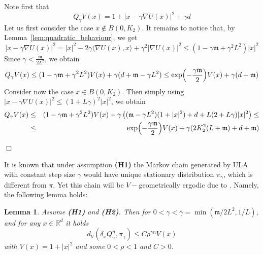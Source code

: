 \documentclass[bj]{imsart}
\def\rset{\mathbb{R}}
\def\rset{\mathbb{R}}
\newcommand{\proofendsign}{$\Box$}
\newtheorem{lem}[thm]{Lemma}
\newenvironment{proof}{{\noindent \bf Proof }}
 {{\hspace*{\fill}\proofendsign\par\bigskip}}
\begin{document}
\begin{proof} 
Note first that
\[
Q_{\gamma}V(x) = 
1+ | x - \gamma \nabla U(x) |^2 + \gamma d
\]
Let us first consider the case $x \notin B(0,K_2)$.  
It remains to notice that, by Lemma~\ref{lem:quadratic_behaviour}, we get
\[
|x - \gamma \nabla U(x) |^2 = |x|^2 - 2\gamma \langle \nabla U(x), x\rangle + \gamma^2 |\nabla U(x)|^2 \leq \left(1 - \gamma \mathfrak{m} + \gamma^2 L^2\right)|x|^2
\]
Since $\gamma < \frac{\mathfrak{m}}{2L^2}$, we obtain
$$
Q_{\gamma}V(x) \leq (1-\gamma \mathfrak{m} + \gamma^2 L^2)V(x) + \gamma (d + \mathfrak{m} - \gamma L^2) \leq \exp\Bigl(-\frac{\gamma \mathfrak{m}}{2}\Bigr)V(x) + \gamma (d + \mathfrak{m})
$$
Consider now the case $x \in B(0,K_2)$. Then simply using $|x-\gamma \nabla U(x)|^2 \leq (1+L\gamma)^2|x|^2$, we obtain
\begin{eqnarray*}
Q_{\gamma}V(x) &\leq & (1-\gamma \mathfrak{m} + \gamma^2 L^2)V(x) + \gamma\left((\mathfrak{m} - \gamma L^2)(1+|x|^2) + d + L(2+L\gamma)|x|^2\right) \leq
\\
&\leq & \exp\Bigl(-\frac{\gamma \mathfrak{m}}{2}\Bigr)V(x) + \gamma(2K_2^2(L+\mathfrak{m}) + d + \mathfrak{m})
\end{eqnarray*}
\end{proof}

It is known that under assumption {\bf (H1)} the Markov chain generated by ULA with constant step size $\gamma$ would have unique stationary distribution $\pi_\gamma$, which is different from $\pi$. Yet this chain will be $V-$geometrically ergodic due to \cite[Theorem~19.4.1]{moulines2018}. Namely, the following lemma holds:

\begin{lem}
\label{lem:v_ergodicity}
 Assume  {\bf (H1)} and {\bf (H2)}. Then for $0 < \gamma < \overline{\gamma}= \min(\mathfrak{m} / 2L^2,1/L)$, and for any $x \in \rset^d$  it holds
$$
d_V(\delta_xQ_{\gamma}^{n},\pi_\gamma) \leq C\rho^{\gamma n} V(x)
$$
with $V(x) = 1 + |x|^2$ and some $0 < \rho < 1$ and $C > 0$.
%
%
%
%
%
\end{lem}
\end{document}
